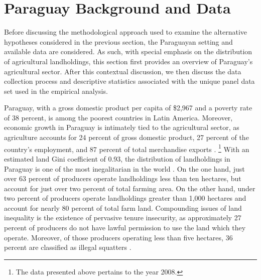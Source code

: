 \documentclass[english]{article}
\begin{document}

\section{Paraguay Background and Data}
\label{sec: data}

Before discussing the methodological approach used to examine the 
alternative hypotheses considered in the previous section, the Paraguayan 
setting and available data are considered.
As such, with special emphasis on the distribution of agricultural landholdings, 
this section first provides an overview of Paraguay's agricultural sector. 
After this contextual discussion, we then discuss the data collection process 
and descriptive statistics associated with the unique panel data set used in the 
empirical analysis.

Paraguay, with a gross domestic product per capita of \$2,967 and a poverty 
rate of 38 percent, is among the poorest countries in Latin America. 
Moreover, economic growth in Paraguay is intimately tied to the agricultural
sector, as agriculture accounts for 24 percent of gross domestic product,
27 percent of the country's employment, and 87 percent of total 
merchandise exports \citep{wdi2012}.%
\footnote{The data presented above pertains to the year 2008.} 
With an estimated land Gini coefficient of 0.93, the distribution of 
landholdings in Paraguay is one of the most inegalitarian in the world 
\citep{lipton2009}. 
On the one hand, just over 63 percent of producers operate landholdings less 
than ten hectares, but account for just over two percent of total farming area.  
On the other hand, under two percent of producers operate landholdings 
greater than 1,000 hectares and account for nearly 80 percent of total farm 
land. 
Compounding issues of land inequality is the existence of pervasive tenure 
insecurity, as approximately 27 percent of producers do not have lawful 
permission to use the land which they operate. 
Moreover, of those producers operating less than five hectares, 36 percent are 
classified as illegal squatters \citep{mag2012}. 
\end{document}

